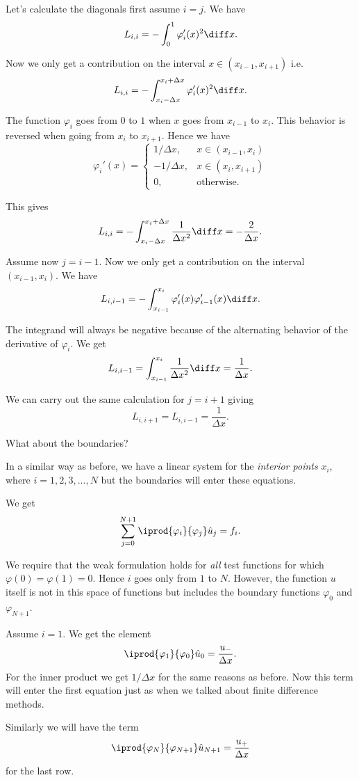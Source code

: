 \begin{frame}
	Let's calculate the diagonals first assume $ i = j $. We have 
	\[ L_{i,i} = -\int_{0}^{1} \varphi_i'(x)^2 \diff x.  \]
	
	\pause
	Now we only get a contribution on the interval $ x \in (x_{i-1},x_{i+1}) $ i.e. 
	\[ L_{i,i} =  - \int_{x_i - \Delta x}^{x_i + \Delta x} \varphi_i'(x)^2 \diff x.  \]
	
	\pause
	The function $ \varphi_i $ goes from $ 0 $ to $ 1 $ when $ x $ goes from $ x_{i-1} $ to $ x_i $. This behavior is reversed when going from $ x_i $ to $ x_{i+1} $. Hence we have
	\[ \varphi_i'(x) = \begin{cases}
		1/\Delta x, & x \in (x_{i-1}, x_{i}) \\
		- 1/\Delta x, & x \in (x_{i},x_{i+1}) \\
		0, & \text{otherwise}.
	\end{cases} \]
\end{frame}

\begin{frame}
	This gives 
	\[ L_{i,i} = - \int_{x_i - \Delta x}^{x_i + \Delta x} \frac{1}{\Delta x^2} \diff x 
	= -\dfrac{2}{\Delta x}.  \]
	
	\pause
	Assume now $ j = i-1 $. Now we only get a contribution on the interval $ (x_{i-1},x_i) $. We have 
	$$ L_{i,i-1} = - \int_{x_{i-1}}^{x_i} \varphi_i'(x) \varphi_{i-1}'(x) \diff x.
	$$
	
	\pause
	The integrand will always be negative because of the alternating behavior of the derivative of $ \varphi_i $. We get 
	\[ L_{i,i-1} = \int_{x_{i-1}}^{x_i} \dfrac{1}{\Delta x^2} \diff x  = \dfrac{1}{\Delta x}. \]
	
	\pause
	We can carry out the same calculation for $ j=i+1 $ giving 
	\[ L_{i,i+1} = L_{i,i-1} = \frac{1}{\Delta x}.\]
	
	\pause
	What about the boundaries?
\end{frame}

\begin{frame}
	In a similar way as before, we have a linear system for the \emph{interior points} $ x_i $, where $ i = 1,2,3,...,N $ but the boundaries will enter these equations. 
	
	\pause
	We get 
	\[ \sum_{j=0}^{N+1} \iprod{\varphi_i}{\varphi_j} \hat{u}_j = f_i. \]
	
	\pause
	We require that the weak formulation holds for \emph{all} test functions for which $ \varphi(0) = \varphi(1) = 0 $. Hence $ i $ goes only from $ 1 $ to $ N $. However, the function $ u $ itself is not in this space of functions but includes the boundary functions $ \varphi_0 $ and $ \varphi_{N+1} $.
	
	\pause
	Assume $ i=1 $. We get the element 
	\[ \iprod{\varphi_1}{\varphi_0} \hat{u}_0 =  \frac{u_-}{\Delta x}.  \]
	For the inner product we get $ 1/\Delta x $ for the same reasons as before. Now this term will enter the first equation just as when we talked about finite difference methods. 
	
	\pause
	Similarly we will have the term 
	\[ \iprod{\varphi_N}{\varphi_{N+1}} \hat{u}_{N+1} =  \frac{u_+}{\Delta x} \]
	for the last row. 
\end{frame}

